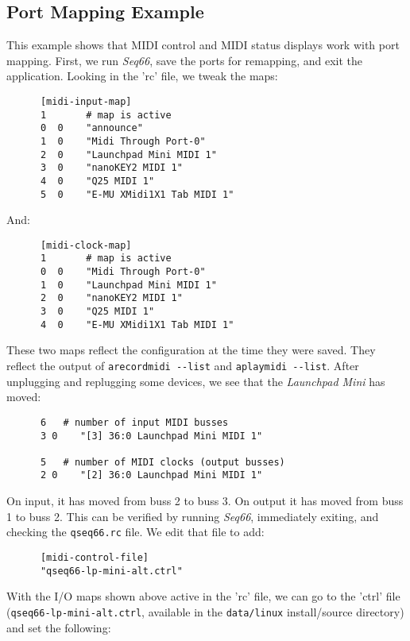 \subsection{Port Mapping Example}
\label{subsec:input_port_mapping_example}

   This example shows that MIDI control and MIDI status displays work with
   port mapping.  First, we run \textsl{Seq66}, save the ports for
   remapping, and exit the application.  Looking in the 'rc' file, we tweak
   the maps:

   \begin{verbatim}
      [midi-input-map]
      1       # map is active
      0  0    "announce"
      1  0    "Midi Through Port-0"
      2  0    "Launchpad Mini MIDI 1"
      3  0    "nanoKEY2 MIDI 1"
      4  0    "Q25 MIDI 1"
      5  0    "E-MU XMidi1X1 Tab MIDI 1"
   \end{verbatim}

   And:

   \begin{verbatim}
      [midi-clock-map]
      1       # map is active
      0  0    "Midi Through Port-0"
      1  0    "Launchpad Mini MIDI 1"
      2  0    "nanoKEY2 MIDI 1"
      3  0    "Q25 MIDI 1"
      4  0    "E-MU XMidi1X1 Tab MIDI 1"
   \end{verbatim}

   These two maps reflect the configuration at the time they were saved.
   They reflect the output of \texttt{arecordmidi -{}-list} and
   \texttt{aplaymidi -{}-list}.
   After unplugging and replugging some devices, we see that the
   \textsl{Launchpad Mini} has moved:

   \begin{verbatim}
      6   # number of input MIDI busses
      3 0    "[3] 36:0 Launchpad Mini MIDI 1"

      5   # number of MIDI clocks (output busses)
      2 0    "[2] 36:0 Launchpad Mini MIDI 1"
   \end{verbatim}

   On input, it has moved from buss 2 to buss 3.
   On output it has moved from buss 1 to buss 2.
   This can be verified by running \textsl{Seq66}, immediately exiting,
   and checking the \texttt{qseq66.rc} file.
   We edit that file to add:

   \begin{verbatim}
      [midi-control-file]
      "qseq66-lp-mini-alt.ctrl"
   \end{verbatim}

   With the I/O maps shown above active in the 'rc' file,
   we can go to the 'ctrl' file (\texttt{qseq66-lp-mini-alt.ctrl}, available in
   the \texttt{data/linux} install/source directory)
   and set the following:

